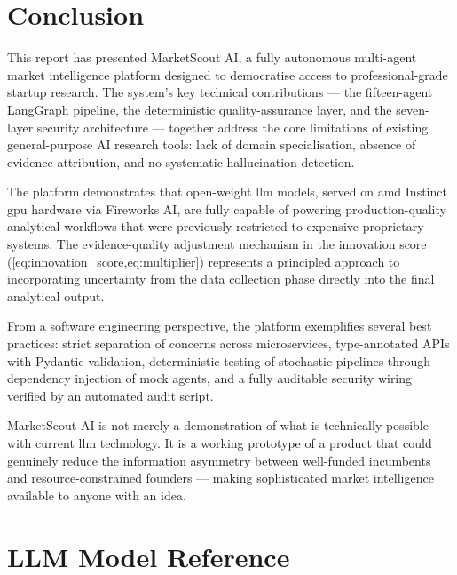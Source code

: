 \documentclass[12pt,a4paper,oneside]{book}
\begin{document}
\chapter{Conclusion}
\label{chap:conclusion}

This report has presented MarketScout AI, a fully autonomous multi-agent market intelligence platform designed to democratise access to professional-grade startup research. The system's key technical contributions — the fifteen-agent LangGraph pipeline, the deterministic quality-assurance layer, and the seven-layer security architecture — together address the core limitations of existing general-purpose AI research tools: lack of domain specialisation, absence of evidence attribution, and no systematic hallucination detection.

The platform demonstrates that open-weight \gls{llm} models, served on \gls{amd} Instinct \gls{gpu} hardware via Fireworks AI, are fully capable of powering production-quality analytical workflows that were previously restricted to expensive proprietary systems. The evidence-quality adjustment mechanism in the innovation score (\cref{eq:innovation_score,eq:multiplier}) represents a principled approach to incorporating uncertainty from the data collection phase directly into the final analytical output.

From a software engineering perspective, the platform exemplifies several best practices: strict separation of concerns across microservices, type-annotated APIs with Pydantic validation, deterministic testing of stochastic pipelines through dependency injection of mock agents, and a fully auditable security wiring verified by an automated audit script.

MarketScout AI is not merely a demonstration of what is technically possible with current \gls{llm} technology. It is a working prototype of a product that could genuinely reduce the information asymmetry between well-funded incumbents and resource-constrained founders — making sophisticated market intelligence available to anyone with an idea.

\appendix

\chapter{LLM Model Reference}
\label{app:models}
\end{document}
